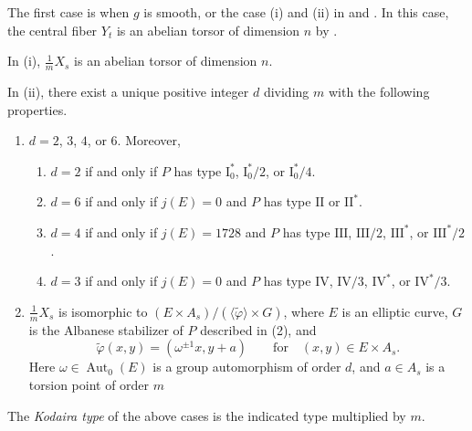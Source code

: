 \documentclass[reqno, letterpaper]{amsart}
\numberwithin{equation}{subsection}
\DeclareMathOperator{\Aut}{Aut}
\begin{document}
		\medskip
		
		The first case is when $g$ is smooth, or the case (i) and (ii) in  and . In this case, the central fiber $Y_t$ is an abelian torsor of dimension $n$ by .
		
		\begin{theorem}  \label{thm:classification of multiple fiber i}
			In (i), $\frac{1}{m}X_s$ is an abelian torsor of dimension $n$.
		\end{theorem}
		
		\begin{theorem}  \label{thm:classification of multiple fiber ii}
			In (ii), there exist a unique positive integer $d$ dividing $m$ with the following properties.
			\begin{enumerate}
				\item $d = 2$, $3$, $4$, or $6$. Moreover,
				\begin{enumerate}
					\item $d = 2$ if and only if $P$ has type $\mathrm I_0^*$, $\mathrm I_0^*/2$, or $\mathrm I_0^*/4$.
					\item $d = 6$ if and only if $j(E) = 0$ and $P$ has type $\mathrm{II}$ or $\mathrm{II}^*$.
					\item $d = 4$ if and only if $j(E) = 1728$ and $P$ has type $\mathrm{III}$, $\mathrm{III}/2$, $\mathrm{III}^*$, or $\mathrm{III}^*/2$.
					\item $d = 3$ if and only if $j(E) = 0$ and $P$ has type $\mathrm{IV}$, $\mathrm{IV}/3$, $\mathrm{IV}^*$, or $\mathrm{IV}^*/3$.
				\end{enumerate}
				
				\item $\frac{1}{m} X_s$ is isomorphic to $(E \times A_s)/(\langle \tilde \varphi \rangle \times G)$, where $E$ is an elliptic curve, $G$ is the Albanese stabilizer of $P$ described in (2), and
				\[ \tilde \varphi (x,y) = (\omega^{\pm1} x, y + a) \qquad\mbox{for}\quad (x,y) \in E \times A_s .\]
				Here $\omega \in \Aut_0 (E)$ is a group automorphism of order $d$, and $a \in A_s$ is a torsion point of order $m$
			\end{enumerate}
		\end{theorem}
		
		\begin{definition}
			The \emph{Kodaira type} of the above cases is the indicated type multiplied by $m$.
		\end{definition}
		
\end{document}
